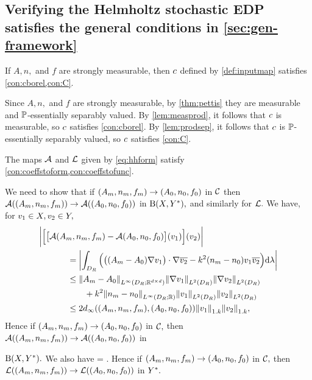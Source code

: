 \subsection{Verifying the Helmholtz stochastic EDP satisfies the general conditions in \cref{sec:gen-framework}}\label{sec:hh-cond}

\label{lem:hh-borelC}
If $A,n,$ and $f$ are strongly measurable, then $c$ defined by  \cref{def:inputmap} satisfies \cref{con:cborel,con:C}.
\ele

\bpf
Since $A,n,$ and $f$ are strongly measurable, by \cref{thm:pettis} they are measurable and $\mathbb P$-essentially separably valued. By \cref{lem:measprod}, it follows that $c$ is measurable, so $c$ satisfies \cref{con:cborel}. By \cref{lem:prodsep}, it follows that $c$ is $\mathbb P$-essentially separably valued, so $c$ satisfies \cref{con:C}.
\epf

\label{lem:hh-AL}
The maps $\mathcal A$ and $\mathcal L$ given by \eqref{eq:hhform} satisfy \cref{con:coeffstoform,con:coeffstofunc}.
\ele

We need to show that if $(A_{m},n_{m},f_{m}) \rightarrow (A_{0},n_{0},f_{0})$ in $\mathcal C$ then $\mathcal A((A_{m},n_{m},f_{m})) \rightarrow \mathcal A((A_{0},n_{0},f_{0}))$ in $\homspace,$ and similarly for $\mathcal L.$ We have, for $v_{1} \in X,v_{2} \in Y,$
\begin{align*}
&\biggabs{\Big[\big[\toform\mleft(\Am,\nm,\fm\mright) - \toform\mleft(\Az,\nz,\fz\mright)\big]\mleft(\vo\mright)\Big]\mleft(\vt\mright)}\\
&\quad\quad\quad\,\,= \abs{\int_{\DR} \Big(\big(\mleft(\Am-\Az\mright)\grad \vo\big)\cdot\grad\vtb- k^2 \mleft(\nm-\nz\mright) \vo\vtb\Big)\dd\Leb}\\
&\quad\quad\quad\,\,\leq\NLiDRRRdtd{\Am-\Az}\NLtDR{\grad \vo}\NLtDR{\grad \vt} 
\\
&\quad\quad\quad\,\,\quad\quad
+k^2\NLiDRRR{\nm-\nz}\NLtDR{\vo}\NLtDR{\vt}\\
&\quad\quad\quad\,\,\leq 2\dinfty((\Am,\nm,\fm),(\Az,\nz,\fz))\Nw{\vo}\Nw{\vt},
\end{align*}
Hence if $(A_{m},n_{m},f_{m}) \rightarrow (A_{0},n_{0},f_{0})$ in $\mathcal C,$ then $\mathcal A((A_{m},n_{m},f_{m})) \rightarrow \mathcal A((A_{0},n_{0},f_{0}))$ in 

\noindent $\homspace.$ We also have
\beqs
\Bigabs{\big[\rhs\mleft(\mleft(\Am,\nm,\fm\mright),\mright) - \rhs\mleft(\mleft(\Az,\nz,\fz\mright)\mright)\big]\mleft(\vt\mright)} 
 = \abs{\int_{\DR} \mleft(\fm- \fz\mright)\vtb\,\dd\Leb}
 \leq \NLtDR{\fm-\fz} .
\eeqs
Hence if $(A_{m},n_{m},f_{m}) \rightarrow (A_{0},n_{0},f_{0})$ in $\mathcal C,$ then $\mathcal L((A_{m},n_{m},f_{m})) \rightarrow \mathcal L((A_{0},n_{0},f_{0}))$ in $Y^{*}.$
\epf

